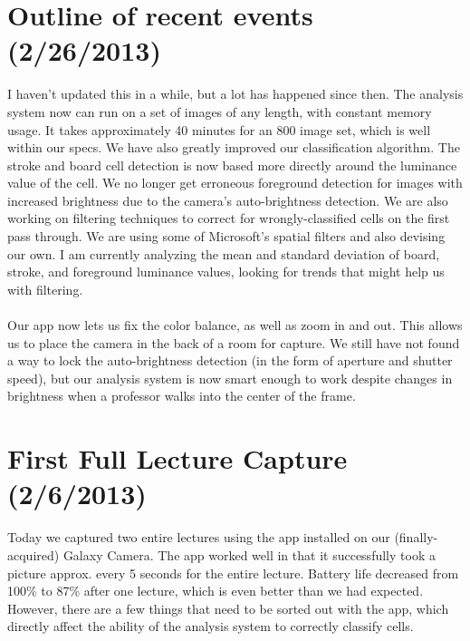 \documentclass[]{article}
\begin{document}
	\section{Outline of recent events (2/26/2013)}
		I haven't updated this in a while, but a lot has happened since then.  The analysis system now can run on a set of images of any length, with constant memory usage.  It takes approximately 40 minutes for an 800 image set, which is well within our specs.  We have also greatly improved our classification algorithm.  The stroke and board cell detection is now based more directly around the luminance value of the cell.  We no longer get erroneous foreground detection for images with increased brightness due to the camera's auto-brightness detection.  We are also working on filtering techniques to correct for wrongly-classified cells on the first pass through.  We are using some of Microsoft's spatial filters and also devising our own.  I am currently analyzing the mean and standard deviation of board, stroke, and foreground luminance values, looking for trends that might help us with filtering.   \\ \\  Our app now lets us fix the color balance, as well as zoom in and out.  This allows us to place the camera in the back of a room for capture. We still have not found a way to lock the auto-brightness detection (in the form of aperture and shutter speed), but our analysis system is now smart enough to work despite changes in brightness when a professor walks into the center of the frame.
		
	\section{First Full Lecture Capture (2/6/2013)}
		Today we captured two entire lectures using the app installed on our (finally-acquired) Galaxy Camera.  The app worked well in that it successfully took a picture approx. every 5 seconds for the entire lecture.  Battery life decreased from 100\% to 87\% after one lecture, which is even better than we had expected.  However, there are a few things that need to be sorted out with the app, which directly affect the ability of the analysis system to correctly classify cells.  
\end{document}
